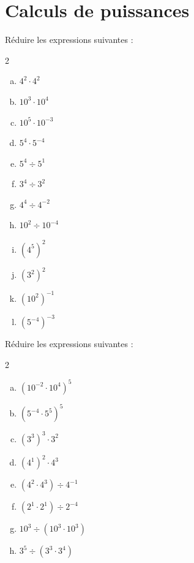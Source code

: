 \documentclass[twoside, a4paper, 12pt, openright, fullpage]{book}
\begin{document}
\section{Calculs de puissances}

\begin{exercice}\label{puissances1}
Réduire les expressions suivantes :
\begin{multicols}{2}
\begin{enumerate}[a)]
    \item $4^2 \cdot 4^2$
    \item $10^3\cdot 10^4$
    \item $10^5 \cdot 10^{-3}$
    \item $5^4\cdot 5^{-4}$
    \item $5^4\div 5^1$
    \item $3^4\div 3^2$
    \item $4^4\div 4^{-2}$
    \item $10^2\div 10^{-4}$
    \item $\left(4^5\right)^2$
    \item $\left(3^2\right)^2$
    \item $\left(10^2\right)^{-1}$
    \item $\left(5^{-4}\right)^{-3}$
    \end{enumerate}
\end{multicols}
\end{exercice}

\begin{exercice}\label{puissances2}
Réduire les expressions suivantes :
\begin{multicols}{2}
\begin{enumerate}[a)]
    \item $\left(10^{-2}\cdot 10^4\right)^5$
    \item $\left(5^{-4}\cdot 5^5\right)^5$
    \item $\left(3^3\right)^3 \cdot 3^2$
    \item $\left(4^1\right)^2 \cdot 4^3$
    \item $\left(4^2\cdot 4^3\right) \div 4^{-1}$
    \item $\left(2^1\cdot 2^1\right) \div 2^{-4}$
    \item $10^3 \div \left(10^3 \cdot 10^3 \right)$
    \item $3^5 \div \left(3^3 \cdot 3^4\right)$
    \end{enumerate}
\end{multicols}
\end{exercice}
\end{document}
